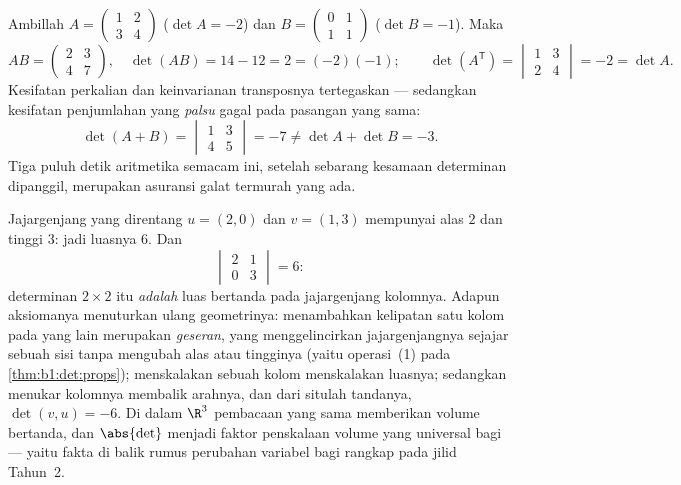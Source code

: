 \begin{example}
\label{ex:b1:det:rulescheck}
Ambillah $A = \begin{pmatrix} 1 & 2\\ 3 & 4\end{pmatrix}$ ($\det A =
-2$) dan $B = \begin{pmatrix} 0 & 1\\ 1 & 1\end{pmatrix}$ ($\det
B = -1$). Maka
\[
AB = \begin{pmatrix} 2 & 3\\ 4 & 7\end{pmatrix},
\quad \det(AB) = 14 - 12 = 2 = (-2)(-1) ;
\qquad
\det(A^{\mathsf T}) = \begin{vmatrix} 1 & 3\\ 2 & 4
\end{vmatrix} = -2 = \det A .
\]
Kesifatan perkalian dan keinvarianan transposnya tertegaskan --- sedangkan
kesifatan penjumlahan yang \emph{palsu} gagal pada pasangan yang sama:
\[
\det(A + B) = \begin{vmatrix} 1 & 3\\ 4 & 5\end{vmatrix} = -7
\neq \det A + \det B = -3 .
\]
Tiga puluh detik aritmetika semacam ini, setelah sebarang kesamaan
determinan dipanggil, merupakan asuransi galat termurah yang ada.
\end{example}

\begin{example}
\label{ex:b1:det:area}
Jajargenjang yang direntang $u = (2, 0)$ dan $v = (1, 3)$ mempunyai
alas $2$ dan tinggi $3$: jadi luasnya $6$. Dan
\[
\begin{vmatrix} 2 & 1\\ 0 & 3\end{vmatrix} = 6 :
\]
determinan $2\times2$ itu \emph{adalah} luas bertanda pada
jajargenjang kolomnya. Adapun aksiomanya menuturkan ulang geometrinya:
menambahkan kelipatan satu kolom pada yang lain merupakan \emph{geseran},
yang menggelincirkan jajargenjangnya sejajar sebuah sisi tanpa mengubah
alas atau tingginya (yaitu operasi~(1) pada \cref{thm:b1:det:props});
menskalakan sebuah kolom menskalakan luasnya; sedangkan menukar kolomnya membalik
arahnya, dan dari situlah tandanya, $\det(v, u) = -6$. Di dalam $\R^3$
pembacaan yang sama memberikan volume bertanda, dan $\abs{\det}$ menjadi
faktor penskalaan volume yang universal bagi  --- yaitu fakta
di balik rumus perubahan variabel bagi  rangkap
pada jilid Tahun~2.
\end{example}

